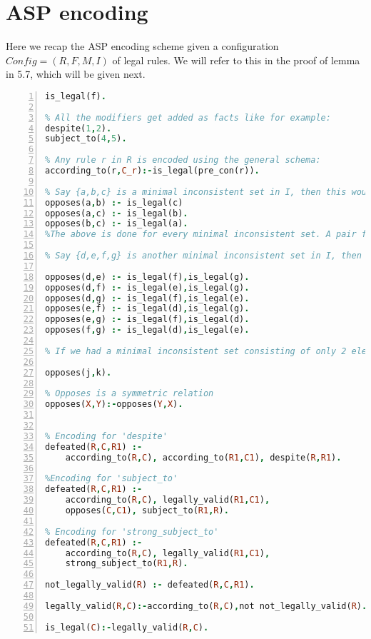 \section{ASP encoding}
Here we recap the ASP encoding scheme given a configuration $Config =
(R,F,M,I)$ of legal rules. We will refer to this in the proof of lemma in 5.7,
which will be given next. 
\begin{lstlisting}[language=Prolog, numbers=left]
% For any f in F, we have:
is_legal(f). 

% All the modifiers get added as facts like for example:
despite(1,2).
subject_to(4,5).

% Any rule r in R is encoded using the general schema:
according_to(r,C_r):-is_legal(pre_con(r)).

% Say {a,b,c} is a minimal inconsistent set in I, then this would get encoded as: 
opposes(a,b) :- is_legal(c)
opposes(a,c) :- is_legal(b).
opposes(b,c) :- is_legal(a).
%The above is done for every minimal inconsistent set. A pair from the set forms the opposes predicate and the rest of the elements go in the body 

% Say {d,e,f,g} is another minimal inconsistent set in I, then this would get encoded as:

opposes(d,e) :- is_legal(f),is_legal(g).
opposes(d,f) :- is_legal(e),is_legal(g).
opposes(d,g) :- is_legal(f),is_legal(e).
opposes(e,f) :- is_legal(d),is_legal(g).
opposes(e,g) :- is_legal(f),is_legal(d).
opposes(f,g) :- is_legal(d),is_legal(e).

% If we had a minimal inconsistent set consisting of only 2 elements say {j,k}, this would get encoded as:

opposes(j,k).

% Opposes is a symmetric relation
opposes(X,Y):-opposes(Y,X).


% Encoding for 'despite'
defeated(R,C,R1) :-
    according_to(R,C), according_to(R1,C1), despite(R,R1).

%Encoding for 'subject_to'
defeated(R,C,R1) :-
    according_to(R,C), legally_valid(R1,C1),
    opposes(C,C1), subject_to(R1,R).

% Encoding for 'strong_subject_to'
defeated(R,C,R1) :-
    according_to(R,C), legally_valid(R1,C1),
    strong_subject_to(R1,R).

not_legally_valid(R) :- defeated(R,C,R1).

legally_valid(R,C):-according_to(R,C),not not_legally_valid(R).

is_legal(C):-legally_valid(R,C).
\end{lstlisting}




